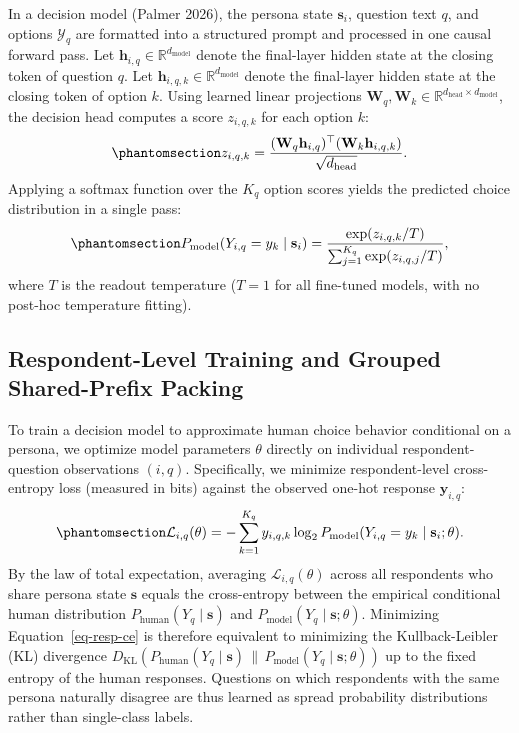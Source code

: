 \documentclass[
  letterpaper,
  DIV=11,
  numbers=noendperiod]{scrartcl}
\begin{document}
In a decision model (Palmer 2026), the persona state \(\mathbf{s}_i\),
question text \(q\), and options \(\mathcal{Y}_q\) are formatted into a
structured prompt and processed in one causal forward pass. Let
\(\mathbf{h}_{i,q} \in \mathbb{R}^{d_{\mathrm{model}}}\) denote the
final-layer hidden state at the closing token of question \(q\). Let
\(\mathbf{h}_{i,q,k} \in \mathbb{R}^{d_{\mathrm{model}}}\) denote the
final-layer hidden state at the closing token of option \(k\). Using
learned linear projections
\(\mathbf{W}_q, \mathbf{W}_k \in \mathbb{R}^{d_{\mathrm{head}} \times d_{\mathrm{model}}}\),
the decision head computes a score \(z_{i,q,k}\) for each option \(k\):
\begin{equation}\protect\phantomsection\label{eq-pointer-head}{
z_{i,q,k} = \frac{(\mathbf{W}_q \mathbf{h}_{i,q})^\top (\mathbf{W}_k \mathbf{h}_{i,q,k})}{\sqrt{d_{\mathrm{head}}}}.
}\end{equation} Applying a softmax function over the \(K_q\) option
scores yields the predicted choice distribution in a single pass:
\begin{equation}\protect\phantomsection\label{eq-model-pmf}{
P_{\mathrm{model}}(Y_{i,q} = y_k \mid \mathbf{s}_i) = \frac{\exp(z_{i,q,k} / T)}{\sum_{j=1}^{K_q} \exp(z_{i,q,j} / T)},
}\end{equation} where \(T\) is the readout temperature (\(T = 1\) for
all fine-tuned models, with no post-hoc temperature fitting).

\subsection{Respondent-Level Training and Grouped Shared-Prefix
Packing}\label{respondent-level-training-and-grouped-shared-prefix-packing}

To train a decision model to approximate human choice behavior
conditional on a persona, we optimize model parameters \(\theta\)
directly on individual respondent-question observations \((i, q)\).
Specifically, we minimize respondent-level cross-entropy loss (measured
in bits) against the observed one-hot response \(\mathbf{y}_{i,q}\):
\begin{equation}\protect\phantomsection\label{eq-resp-ce}{
\mathcal{L}_{i,q}(\theta) = -\sum_{k=1}^{K_q} y_{i,q,k} \log_2 P_{\mathrm{model}}(Y_{i,q} = y_k \mid \mathbf{s}_i; \theta).
}\end{equation} By the law of total expectation, averaging
\(\mathcal{L}_{i,q}(\theta)\) across all respondents who share persona
state \(\mathbf{s}\) equals the cross-entropy between the empirical
conditional human distribution
\(P_{\mathrm{human}}(Y_q \mid \mathbf{s})\) and
\(P_{\mathrm{model}}(Y_q \mid \mathbf{s}; \theta)\). Minimizing
Equation~\ref{eq-resp-ce} is therefore equivalent to minimizing the
Kullback-Leibler (KL) divergence
\(D_{\mathrm{KL}}(P_{\mathrm{human}}(Y_q \mid \mathbf{s}) \,\|\, P_{\mathrm{model}}(Y_q \mid \mathbf{s}; \theta))\)
up to the fixed entropy of the human responses. Questions on which
respondents with the same persona naturally disagree are thus learned as
spread probability distributions rather than single-class labels.
\end{document}
